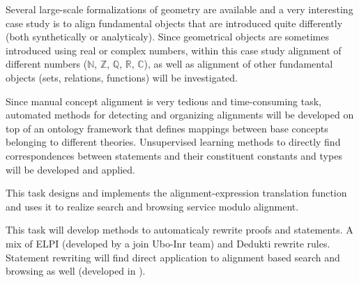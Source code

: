 \begin{workpackage}
\begin{tasklist}
  \begin{task}[id=aligncasestudies,title=Case study: aligning geometry,lead=Str,StrRM=18,BelRM=18]
    Several large-scale formalizations of geometry are available and a
    very interesting case study is to align fundamental objects that
    are introduced quite differently (both synthetically or
    analyticaly). Since geometrical objects are sometimes introduced
    using real or complex numbers, within this case study alignment of
    different numbers ($\mathbb{N}$, $\mathbb{Z}$, $\mathbb{Q}$,
    $\mathbb{R}$, $\mathbb{C}$), as well as alignment of other
    fundamental objects (sets, relations, functions) will be
    investigated.
  \end{task}

  \begin{task}[id=aligntheories,title=Automated theory alignment,lead=Imt,imtRM=6,InnRM=6,SacRM=6]
    Since manual concept alignment is very tedious and time-consuming
    task, automated methods for detecting and organizing alignments
    will be developed on top of an ontology framework that defines
    mappings between base concepts belonging to different
    theories. Unsupervised learning methods to directly find
    correspondences between statements and their constituent constants
    and types will be developed and applied.
  \end{task}

  \begin{task}[id=alignsearch,title=Alignment-Based Search,lead=Fau,FauRM=18]
    This task designs and implements the alignment-expression
    translation function and uses it to realize search and browsing
    service modulo alignment.
  \end{task}
  
  \begin{task}[id=alignproofs,title=Alignment-Based Proof-Rewriting,lead=Bol,BolRM=13,InrRM=6]
    This task will develop methods to automaticaly rewrite proofs and
    statements.  A mix of ELPI (developed by a join Ubo-Inr team) and
    Dedukti rewrite rules. Statement rewriting will find direct
    application to alignment based search and browsing as well
    (developed in ).
  \end{task}
\end{tasklist}


\end{workpackage}
